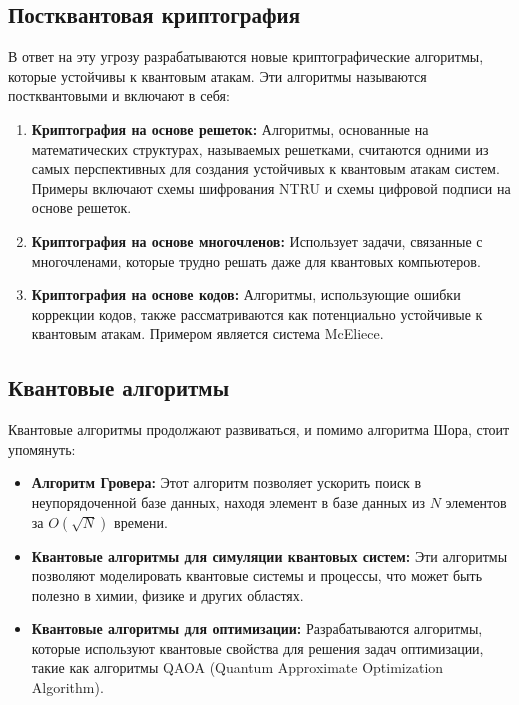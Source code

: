 \documentclass[12pt]{article}
\begin{document}
\subsection{Постквантовая криптография}
В ответ на эту угрозу разрабатываются новые криптографические алгоритмы, которые устойчивы к квантовым атакам. Эти алгоритмы называются постквантовыми и включают в себя:

\begin{enumerate}[label=\arabic*.]
    \item \textbf{Криптография на основе решеток:} Алгоритмы, основанные на математических структурах, называемых решетками, считаются одними из самых перспективных для создания устойчивых к квантовым атакам систем. Примеры включают схемы шифрования NTRU и схемы цифровой подписи на основе решеток.
    
    \item \textbf{Криптография на основе многочленов:} Использует задачи, связанные с многочленами, которые трудно решать даже для квантовых компьютеров. 
    
    \item \textbf{Криптография на основе кодов:} Алгоритмы, использующие ошибки коррекции кодов, также рассматриваются как потенциально устойчивые к квантовым атакам. Примером является система McEliece.
\end{enumerate}

\subsection{Квантовые алгоритмы}
Квантовые алгоритмы продолжают развиваться, и помимо алгоритма Шора, стоит упомянуть:

\begin{itemize}
    \item \textbf{Алгоритм Гровера:} Этот алгоритм позволяет ускорить поиск в неупорядоченной базе данных, находя элемент в базе данных из $N$ элементов за $O(\sqrt{N})$ времени.
    
    \item \textbf{Квантовые алгоритмы для симуляции квантовых систем:} Эти алгоритмы позволяют моделировать квантовые системы и процессы, что может быть полезно в химии, физике и других областях.
    
    \item \textbf{Квантовые алгоритмы для оптимизации:} Разрабатываются алгоритмы, которые используют квантовые свойства для решения задач оптимизации, такие как алгоритмы QAOA (Quantum Approximate Optimization Algorithm).
\end{itemize}
\end{document}
